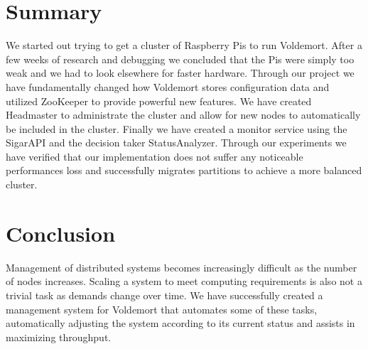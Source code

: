 \section{Summary}
We started out trying to get a cluster of Raspberry Pis to run Voldemort. After a few weeks of research and debugging we concluded that the Pis were simply too weak and we had to look elsewhere for faster hardware. Through our project we have fundamentally changed how Voldemort stores configuration data and utilized ZooKeeper to provide powerful new features. We have created Headmaster to administrate the cluster and allow for new nodes to automatically be included in the cluster. Finally we have created a monitor service using the SigarAPI and the decision taker StatusAnalyzer. Through our experiments we have verified that our implementation does not suffer any noticeable performances loss and successfully migrates partitions to achieve a more balanced cluster. 

\section{Conclusion}
Management of distributed systems becomes increasingly difficult as the number of nodes increases. Scaling a system to meet computing requirements is also not a trivial task as demands change over time. We have successfully created a management system for Voldemort that automates some of these tasks, automatically adjusting the system according to its current status and assists in maximizing throughput. 
